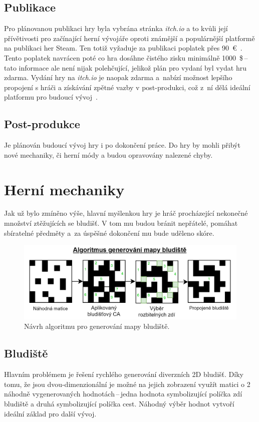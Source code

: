 \subsection*{Publikace}
Pro plánovanou publikaci hry byla vybrána stránka \textit{itch.io} a to kvůli její přívětivosti pro začínající herní vývojáře oproti známější a populárnější platformě na publikaci her Steam. Ten totiž vyžaduje za publikaci poplatek přes 90~€~\cite{Steam_submission}. Tento poplatek navrácen poté co hra dosáhne čistého zisku minimálně 1000~\$\,--\,tato informace ale není nijak polehčující, jelikož plán pro vydaní byl vydat hru zdarma. Vydání hry na \textit{itch.io} je naopak zdarma a~nabízí možnost lepšího propojení s hráči a získávání zpětné vazby v post-produkci, což z~ní dělá ideální platformu pro budoucí vývoj~\cite{GDevelop}.

\subsection*{Post-produkce}
Je plánován budoucí vývoj hry i po dokončení práce. Do hry by mohli přibýt nové mechaniky, či herní módy a budou opravovány nalezené chyby.

\section{Herní mechaniky}\label{chap:Herní mechaniky}
Jak už bylo zmíněno výše, hlavní myšlenkou hry je hráč procházející nekonečné množství ztěžujících se bludišť. V tom mu budou bránit nepřátelé, pomáhat sbíratelné předměty a~za úspěšné dokončení mu bude uděleno skóre.

\begin{figure}[h]
    \centering
    \includegraphics[width=\textwidth]{obrazky-figures/ch3/algoritmus_generovani_mapy.png}
    \caption{Návrh algoritmu pro generování mapy bludiště.}
    \label{fig:algoritmus_generovani_mapy}
\end{figure}

\subsection*{Bludiště}
Hlavním problémem je řešení rychlého generování diverzních 2D bludišť. Díky tomu, že jsou dvou-dimenzionální je možné na jejich zobrazení využít matici o 2 náhodně vygenerovaných hodnotách\,--\,jedna hodnota symbolizující políčka zdí bludiště a druhá symbolizující políčka cest. Náhodný výběr hodnot vytvoří ideální základ pro další vývoj.

